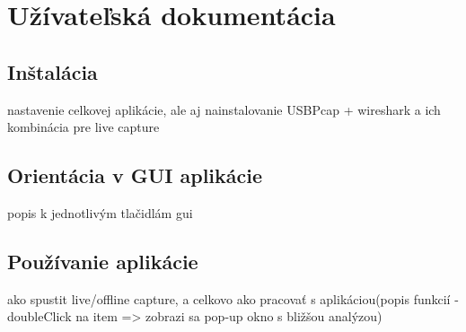 \chapter{Užívateľská dokumentácia}
\label{udok:chap}

\section{Inštalácia}
nastavenie celkovej aplikácie, ale aj nainstalovanie USBPcap + wireshark a ich kombinácia pre live capture
\section{Orientácia v GUI aplikácie}
popis k jednotlivým tlačidlám gui
\section{Používanie aplikácie}
ako spustit live/offline capture, a celkovo ako pracovať s aplikáciou(popis funkcií - doubleClick na item => zobrazi sa pop-up okno s bližšou analýzou)



